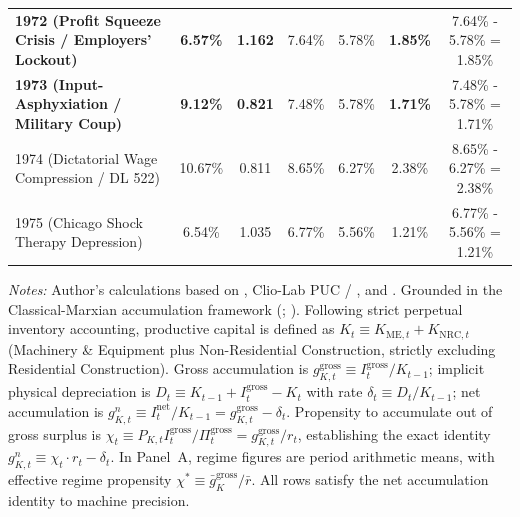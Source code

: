 \begin{table}[htbp]
{\begin{tabular}{lcccccc}
\textbf{1972 (Profit Squeeze Crisis / Employers' Lockout)} & \textbf{6.57\%} & \textbf{1.162} & 7.64\% & 5.78\% & \textbf{1.85\%} & 7.64\% - 5.78\% = 1.85\% \\
\textbf{1973 (Input-Asphyxiation / Military Coup)} & \textbf{9.12\%} & \textbf{0.821} & 7.48\% & 5.78\% & \textbf{1.71\%} & 7.48\% - 5.78\% = 1.71\% \\
1974 (Dictatorial Wage Compression / DL 522) & 10.67\% & 0.811 & 8.65\% & 6.27\% & 2.38\% & 8.65\% - 6.27\% = 2.38\% \\
1975 (Chicago Shock Therapy Depression) & 6.54\% & 1.035 & 6.77\% & 5.56\% & 1.21\% & 6.77\% - 5.56\% = 1.21\% \\
\bottomrule
\end{tabular}%
}
\begin{minipage}{0.98\textwidth}
\vspace{0.4em}
\footnotesize
\textit{Notes:} Author's calculations based on \citet{Astorga2023}, Clio-Lab PUC / \citet{DiazLudersWagner2016}, and \citet{Polanco2026}. Grounded in the Classical-Marxian accumulation framework (\citealt{Weisskopf1978,Weisskopf1979}; \citealt[Section 6.1]{Basu2017}). Following strict perpetual inventory accounting, productive capital is defined as $K_t \equiv K_{\text{ME}, t} + K_{\text{NRC}, t}$ (Machinery \& Equipment plus Non-Residential Construction, strictly excluding Residential Construction). Gross accumulation is $g^{\text{gross}}_{K, t} \equiv I^{\text{gross}}_t / K_{t-1}$; implicit physical depreciation is $D_t \equiv K_{t-1} + I^{\text{gross}}_t - K_t$ with rate $\delta_t \equiv D_t / K_{t-1}$; net accumulation is $g^n_{K, t} \equiv I^{\text{net}}_t / K_{t-1} = g^{\text{gross}}_{K, t} - \delta_t$. Propensity to accumulate out of gross surplus is $\chi_t \equiv P_{K, t} I^{\text{gross}}_t / \Pi^{\text{gross}}_t = g^{\text{gross}}_{K, t} / r_t$, establishing the exact identity $g^n_{K, t} \equiv \chi_t \cdot r_t - \delta_t$. In Panel~A, regime figures are period arithmetic means, with effective regime propensity $\chi^* \equiv \bar{g}^{\text{gross}}_K / \bar{r}$. All rows satisfy the net accumulation identity to machine precision.
\end{minipage}
\end{table}
